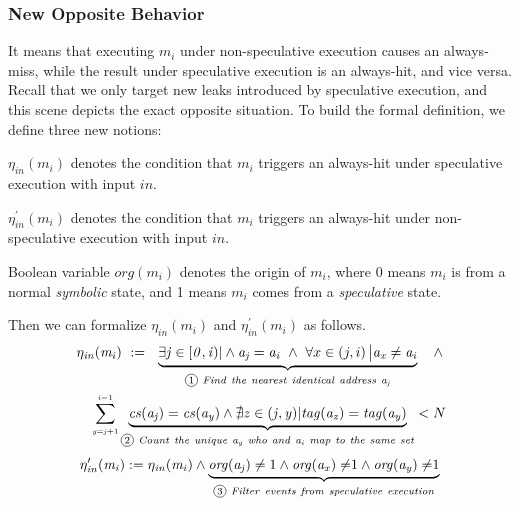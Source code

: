 \documentclass[sigconf]{acmart}
\newcommand*\circled[1]{\tikz[baseline=(char.base)]{
				\node[shape=circle,draw,inner sep=1pt] (char) {\scriptsize{#1}};}}
\begin{document}
\subsubsection{New Opposite Behavior}
\label{sec:new_opp}
It means that executing $\mathit{m_i}$ under non-speculative execution causes an 
always-miss, while the result under speculative execution is an always-hit, 
and vice versa. Recall that we only target new leaks introduced by speculative 
execution, and this scene depicts the exact opposite situation. To build the 
formal definition, we define three new notions: 
%
%
\begin{itemize*}
  \item $\mathit{\eta_{in}(m_i)}$ denotes the condition that $\mathit{m_i}$ 
	triggers an always-hit under speculative execution with input $\mathit{in}$.
  \item $\mathit{\eta^\prime_{in}(m_i)}$ denotes the condition that $\mathit{m_i}$ 
	triggers an always-hit under non-speculative execution with input $\mathit{in}$.
  \item Boolean variable $\mathit{org(m_i)}$ denotes the origin of $\mathit{m_i}$, 
  where 0 means $\mathit{m_i}$ is from a normal \textit{symbolic} state, and 1 
	means $\mathit{m_i}$ comes from a \textit{speculative} state.
\end{itemize*}
%
%
Then we can formalize $\mathit{\eta_{in}(m_i)}$ and $\mathit{\eta^\prime_{in}(m_i)}$ as follows. 
%
\begin{multline}
  \label{eqn:hc1}
    \mathit{\eta_{in}(m_i)}~:=~~ 
     \underbrace{ 
      \exists\mathit{j}\in[\mathit{0,i})|
      \wedge 
      \mathit{a_j}=\mathit{a_i} 
    ~\wedge~
      {\forall}x\in\left(j,i\right)\big|\mathit{a_x}\ne\mathit{a_i}
    }_{{\circled{1}}\mathit{~Find~the~nearest~identical~address~a_j}}
		~~~\wedge 
		\\
    ~~~~\sum_{{\scriptscriptstyle \mathit{y=j}+1}}^{{\scriptscriptstyle \mathit{i-}1}} 
    \underbrace{
      \mathit{cs(a_j)}=\mathit{cs(a_y)} 
      \wedge
      \nexists\mathit{z}\in(\mathit{j,y})|\mathit{tag(a_z)}=\mathit{tag(a_y)}
    }_{{\circled{2}}\mathit{~Count~the~unique~a_y~who~and~a_i~map~to~the~same~set}}
    <N
\end{multline}
\vspace{.2ex}
\begin{multline}
  \label{eqn:hc2}
    \mathit{\eta^\prime_{in}(m_i)}:=\mathit{\eta_{in}(m_i)}\wedge
    \underbrace{
      \mathit{org(a_j)}\ne1 
      \wedge
      \mathit{org(a_x)\ne}1 
      \wedge
      \mathit{org(a_y)\ne}1 
    }_{{\circled{3}}\mathit{~Filter~events~from~speculative~execution}}
\end{multline}
%
%
\end{document}
